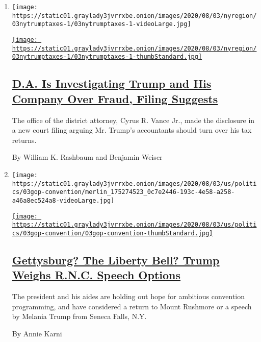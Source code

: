 \begin{enumerate}
\def\labelenumi{\arabic{enumi}.}
\item
  \texttt{[image: https://static01.graylady3jvrrxbe.onion/images/2020/08/03/nyregion/03nytrumptaxes-1/03nytrumptaxes-1-videoLarge.jpg]}

  \href{/2020/08/03/nyregion/donald-trump-taxes-cyrus-vance.html}{\texttt{[image: https://static01.graylady3jvrrxbe.onion/images/2020/08/03/nyregion/03nytrumptaxes-1/03nytrumptaxes-1-thumbStandard.jpg]}}

  \hypertarget{da-is-investigating-trump-and-his-company-over-fraud-filing-suggests}{%
  \subsection{\texorpdfstring{\href{/2020/08/03/nyregion/donald-trump-taxes-cyrus-vance.html}{D.A.
  Is Investigating Trump and His Company Over Fraud, Filing
  Suggests}}{D.A. Is Investigating Trump and His Company Over Fraud, Filing Suggests}}\label{da-is-investigating-trump-and-his-company-over-fraud-filing-suggests}}

  The office of the district attorney, Cyrus R. Vance Jr., made the
  disclosure in a new court filing arguing Mr. Trump's accountants
  should turn over his tax returns.

  By William K. Rashbaum and Benjamin Weiser
\item
  \texttt{[image: https://static01.graylady3jvrrxbe.onion/images/2020/08/03/us/politics/03gop-convention/merlin\_175274523\_0c7e2446-193c-4e58-a258-a46a8ec524a8-videoLarge.jpg]}

  \href{/2020/08/03/us/politics/trump-rnc-speech.html}{\texttt{[image: https://static01.graylady3jvrrxbe.onion/images/2020/08/03/us/politics/03gop-convention/03gop-convention-thumbStandard.jpg]}}

  \hypertarget{gettysburg-the-liberty-bell-trump-weighs-rnc-speech-options}{%
  \subsection{\texorpdfstring{\href{/2020/08/03/us/politics/trump-rnc-speech.html}{Gettysburg?
  The Liberty Bell? Trump Weighs R.N.C. Speech
  Options}}{Gettysburg? The Liberty Bell? Trump Weighs R.N.C. Speech Options}}\label{gettysburg-the-liberty-bell-trump-weighs-rnc-speech-options}}

  The president and his aides are holding out hope for ambitious
  convention programming, and have considered a return to Mount Rushmore
  or a speech by Melania Trump from Seneca Falls, N.Y.

  By Annie Karni
\end{enumerate}

